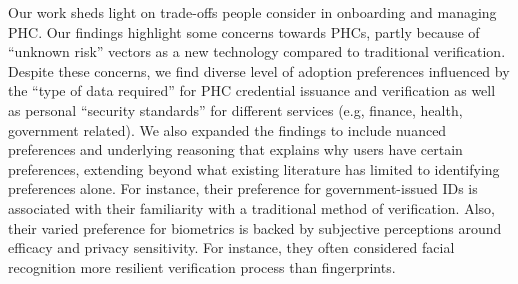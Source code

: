 Our work sheds light on trade-offs people consider in onboarding and managing PHC. Our findings highlight some concerns towards PHCs, partly because of “unknown risk” vectors as a new technology compared to traditional verification. Despite these concerns, we find diverse level of adoption preferences
influenced by the “type of data required” for PHC credential issuance and verification as well as personal “security standards” for different services (e.g, finance, health, government
related). 
We also expanded the findings to include nuanced preferences and underlying reasoning that explains why users have certain preferences, extending beyond what existing literature has limited to identifying preferences alone.
For instance, their preference for government-issued IDs is associated with their familiarity with a traditional method of verification. Also, their varied preference for biometrics is backed by subjective perceptions around efficacy and privacy sensitivity. For instance, they often considered facial recognition more resilient verification process than fingerprints.




